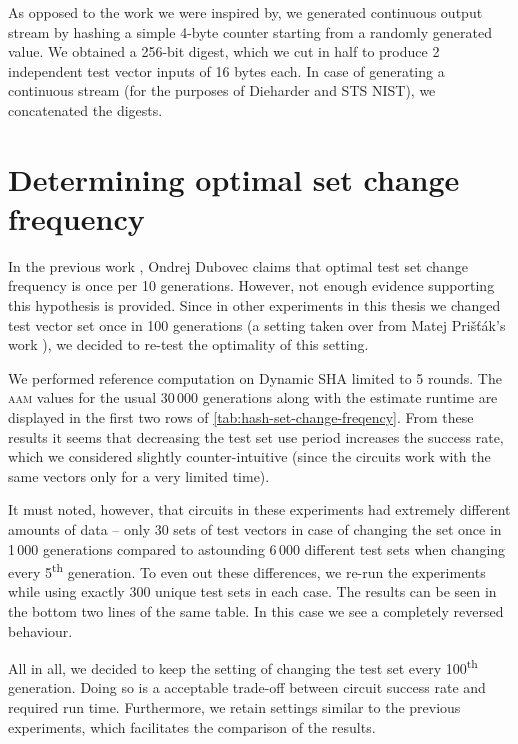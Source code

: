 \documentclass[12pt,oneside]{fithesis2}
\begin{document}
As opposed to the work we were inspired by, we generated continuous output stream by hashing a simple 4-byte counter starting
from a randomly generated value. We obtained a 256-bit digest, which we cut in half to produce 2 independent test vector inputs
of 16 bytes each. In case of generating a continuous stream (for the purposes of Dieharder and STS NIST), we concatenated 
the digests.

\section{Determining optimal set change frequency}
\label{sec:hash-set-change-freqency}

In the previous work \parencite{thesis-dubovec}, Ondrej Dubovec claims that optimal test set change frequency is once
per 10 generations. However, not enough evidence supporting this hypothesis is provided. Since in other experiments in this thesis
we changed test vector set once in 100 generations (a setting taken over from Matej Prišťák's work \parencite{thesis-pristak}), 
we decided to re-test the optimality of this setting.

We performed reference computation on Dynamic SHA limited to 5 rounds. The \textsc{aam} values for the usual 30\,000 generations
along with the estimate runtime are displayed in the first two rows of \autoref{tab:hash-set-change-freqency}.
From these results it seems that decreasing the test set use period increases the success rate, which we considered slightly
counter-intuitive (since the circuits work with the same vectors only for a very limited time).

It must noted, however, that circuits in these experiments had extremely different amounts of data -- only 30 sets of test vectors
in case of changing the set once in 1\,000 generations compared to astounding 6\,000 different test sets when changing every 
5\textsuperscript{th} generation. To even out these differences, we re-run the experiments while using exactly 300 unique test sets
in each case. The results can be seen in the bottom two lines of the same table. In this case we see a completely reversed
behaviour.

All in all, we decided to keep the setting of changing the test set every 100\textsuperscript{th} generation.
Doing so is a acceptable trade-off between circuit success rate and required run time. 
Furthermore, we retain settings similar to the previous experiments, which facilitates the comparison of the results.
\bigskip
\end{document}
